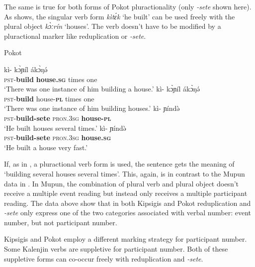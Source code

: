 \documentclass[output=paper,colorlinks,citecolor=brown
]{langscibook}
\begin{document}
\noindent The same is true for both forms of Pokot pluractionality (only \textit{-sete} shown here). As  shows, the singular verb form \textit{kìtɛ́k} `he built' can be used freely with the plural object \textit{kɔ̀ːrín} `houses'. The verb doesn't have to be modified by a pluractional marker like reduplication or \textit{-sete}.

\ea Pokot
\begin{xlist}
\ex 
\gll kì-  kɔ̀ɲíl ákɔ̀ŋə́\\
\textsc{pst}-\textbf{build} \textbf{house.\textsc{sg}} times one\\
\glt `There was one instance of him building a house.'
\ex \label{ex:fiebig:sgpl}
\gll kì-  kɔ̀ɲíl ákɔ̀ŋə́\\
\textsc{pst}-\textbf{build} house-\textbf{\textsc{pl}} times one\\ 
\glt `There was one instance of him building houses.' 
\ex \label{ex:fiebig:plpl}
\gll kì- ɲíndə̀ \\
\textsc{pst}-\textbf{build-sete} \textsc{pron.3sg} \textbf{house-\textsc{pl}}\\
\glt `He built houses several times.' 
\ex 
\gll kì- ɲíndə̀ \\
\textsc{pst}-\textbf{build-sete} \textsc{pron.3sg} \textbf{house.\textsc{sg}}\\
\glt `He built a house very fast.'
\end{xlist}
\z

\noindent If, as in , a pluractional verb form is used, the sentence gets the meaning of `building several houses several times'. This, again, is in contrast to the Mupun data in . In Mupun, the combination of plural verb and plural object doesn't receive a multiple event reading but instead only receives a multiple participant reading. The data above show that in both Kipsigis and Pokot reduplication and \textit{-sete} only express one of the two categories associated with verbal number: event number, but not participant number.

Kipsigis and Pokot employ a different marking strategy for participant number. Some Kalenjin verbs are suppletive for participant number. Both of these suppletive forms can co-occur freely with reduplication and \textit{-sete}.
\end{document}

